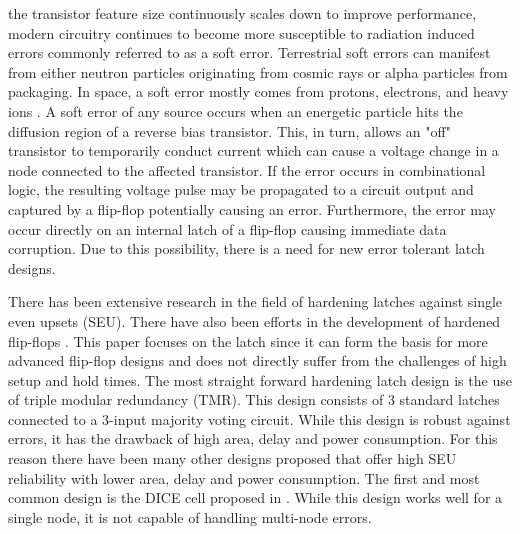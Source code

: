 
% 
 the transistor feature size continuously scales down to improve performance, modern circuitry continues to become more susceptible to radiation induced errors commonly referred to as a soft error. Terrestrial soft errors can manifest from either neutron particles originating from cosmic rays or alpha particles from packaging. In space, a soft error mostly comes from protons, electrons, and heavy ions \cite{Zick2008, Schwank2013}. A soft error of any source occurs when an energetic particle hits the diffusion region of a reverse bias transistor. This, in turn, allows an "off" transistor to temporarily conduct current which can cause a voltage change in a node connected to the affected transistor. If the error occurs in combinational logic, the resulting voltage pulse may be propagated to a circuit output and captured by a flip-flop potentially causing an error. Furthermore, the error may occur directly on an internal latch of a flip-flop causing immediate data corruption. Due to this possibility, there is a need for new error tolerant latch designs.

There has been extensive research in the field of hardening latches against single even upsets (SEU). There have also been efforts in the development of hardened flip-flops \cite{Clark2015}. This paper focuses on the latch since it can form the basis for more advanced flip-flop designs and does not directly suffer from the challenges of high setup and hold times. The most straight forward hardening latch design is the use of triple modular redundancy (TMR). This design consists of 3 standard latches connected to a 3-input majority voting circuit. While this design is robust against errors, it has the drawback of high area, delay and power consumption. For this reason there have been many other designs proposed that offer high SEU reliability with lower area, delay and power consumption. The first and most common design is the DICE cell proposed in \cite{DICE}. While this design works well for a single node, it is not capable of handling multi-node errors. 

